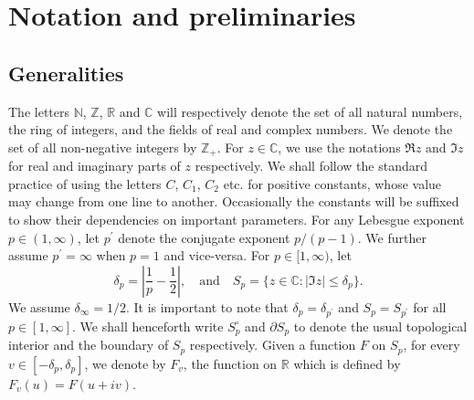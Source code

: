 \documentclass[12pt,reqno]{amsart}
\newcommand{\R}{\mathbb R}
\newcommand{\C}{\mathbb C}
\newcommand{\Z}{\mathbb Z}%
\newcommand{\N}{\mathbb N}
\newtheorem{theorem}{Theorem}[section]
\theoremstyle{definition}
\theoremstyle{definition}
\numberwithin{equation}{section}
\begin{document}



\section{Notation and preliminaries}\label{section2}

\subsection{Generalities}
The letters $\N$, $\Z$, $\R$ and $\C$ will respectively denote the set of all natural numbers, the ring of integers, and the fields of real and complex numbers. We denote the set of all non-negative integers by $ \Z_+ $. For $ z \in \C $, we use the notations $\Re z$ and $\Im z$ for real and imaginary parts of $z$ respectively. We shall follow the standard practice of using the letters $C$, $C_1$, $C_2$ etc. for positive constants, whose value may change from one line to another. Occasionally the constants will be suffixed to show their dependencies on important parameters. For any Lebesgue exponent $ p \in (1,\infty)$, let $p^{\prime}$ denote the conjugate exponent $p/(p-1)$. We further assume $p^{\prime}=\infty$ when $p=1$ and vice-versa. For $p\in[1,\infty)$, let
$$\delta_p=\left|\frac{1}{p}-\frac{1}{2}\right|,\quad\text{and}\quad S_{p}=\{z\in\mathbb{C}:|\Im z|\leq\delta_{p}\}.$$
We assume $\delta_{\infty}=1/2$. It is important to note that $\delta_{p}=\delta_{p^{\prime}}$ and $S_{p}=S_{p^{\prime}}$ for all $p\in[1,\infty]$. We shall henceforth write $S^{\circ}_{p}$ and $\partial S_{p}$ to denote the usual topological interior and the boundary of $S_{p}$ respectively. Given a  function $F$ on $S_{p}$, for every $v\in [-\delta_{p}, \delta_{p}]$, we denote by $F_{v}$, the function on $\R$ which is defined by $F_v(u) = F(u+iv)$.
\end{document}
